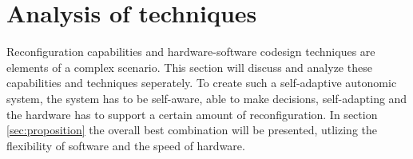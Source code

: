 \section{Analysis of techniques}
\label{sec:technique}
Reconfiguration capabilities and hardware-software codesign techniques are elements of a complex scenario. This section will discuss and analyze these capabilities and techniques seperately. To create such a self-adaptive autonomic system, the system has to be self-aware, able to make decisions, self-adapting and the hardware has to support a certain amount of reconfiguration. In section \ref{sec:proposition} the overall best combination will be presented, utlizing the flexibility of software and the speed of hardware.








